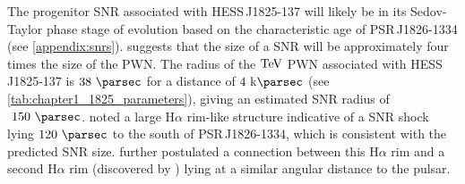 The progenitor SNR associated with \mbox{HESS\,J1825-137} will likely be in its Sedov-Taylor phase stage of evolution based on the characteristic age of \mbox{PSR\,J1826-1334} (see \autoref{appendix:snrs}). \cite{2001A&A...380..309V} suggests that the size of a SNR will be approximately four times the size of the PWN. The radius of the $\TeV$ PWN associated with \mbox{HESS\,J1825-137} is $38~\pc$ for a distance of $4~\kpc$ (see \autoref{tab:chapter1_1825_parameters}), giving an estimated SNR radius of $~150~\pc$. \cite{2016MNRAS.458.2813V} noted a large H$\alpha$ rim-like structure indicative of a SNR shock lying $120~\pc$ to the south of \mbox{PSR\,J1826-1334}, which is consistent with the predicted SNR size. \cite{2016MNRAS.458.2813V} further postulated a connection between this H$\alpha$ rim and a second H$\alpha$ rim (discovered by \cite{2008MNRAS.390.1037S}) lying at a similar angular distance to the pulsar.

